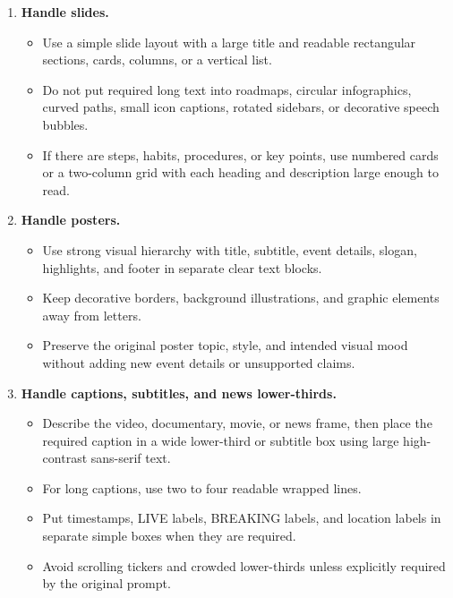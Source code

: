\documentclass{llmxive}
\begin{document}
\begin{tcolorbox}
\begin{enumerate}[leftmargin=1.5em, itemsep=0.2em, topsep=0.2em, parsep=0pt, partopsep=0pt]
    \item \textbf{Handle slides.}
    \begin{itemize}[leftmargin=1.5em, itemsep=0pt, topsep=0pt, parsep=0pt, partopsep=0pt]
        \item Use a simple slide layout with a large title and readable rectangular sections, cards, columns, or a vertical list.
        \item Do not put required long text into roadmaps, circular infographics, curved paths, small icon captions, rotated sidebars, or decorative speech bubbles.
        \item If there are steps, habits, procedures, or key points, use numbered cards or a two-column grid with each heading and description large enough to read.
    \end{itemize}

    \item \textbf{Handle posters.}
    \begin{itemize}[leftmargin=1.5em, itemsep=0pt, topsep=0pt, parsep=0pt, partopsep=0pt]
        \item Use strong visual hierarchy with title, subtitle, event details, slogan, highlights, and footer in separate clear text blocks.
        \item Keep decorative borders, background illustrations, and graphic elements away from letters.
        \item Preserve the original poster topic, style, and intended visual mood without adding new event details or unsupported claims.
    \end{itemize}

    \item \textbf{Handle captions, subtitles, and news lower-thirds.}
    \begin{itemize}[leftmargin=1.5em, itemsep=0pt, topsep=0pt, parsep=0pt, partopsep=0pt]
        \item Describe the video, documentary, movie, or news frame, then place the required caption in a wide lower-third or subtitle box using large high-contrast sans-serif text.
        \item For long captions, use two to four readable wrapped lines.
        \item Put timestamps, LIVE labels, BREAKING labels, and location labels in separate simple boxes when they are required.
        \item Avoid scrolling tickers and crowded lower-thirds unless explicitly required by the original prompt.
    \end{itemize}


\end{enumerate}
\end{tcolorbox}
\end{document}
